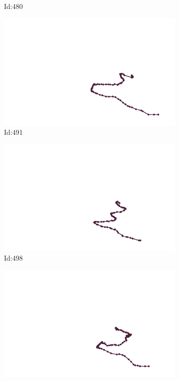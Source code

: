 \documentclass[12pt,twoside]{report}
\begin{document}
\begin{figure}
\begin{subfigure}[b]{0.20\textwidth}
\caption{Id:480}
\end{subfigure}
\begin{subfigure}[b]{0.20\textwidth}
\centering
\includegraphics[width=\textwidth]{../trajectories/491.png}
\caption{Id:491}
\end{subfigure}
\begin{subfigure}[b]{0.20\textwidth}
\centering
\includegraphics[width=\textwidth]{../trajectories/498.png}
\caption{Id:498}
\end{subfigure}
\begin{subfigure}[b]{0.20\textwidth}
\centering
\includegraphics[width=\textwidth]{../trajectories/522.png}

\end{subfigure}
\end{figure}
\end{document}
